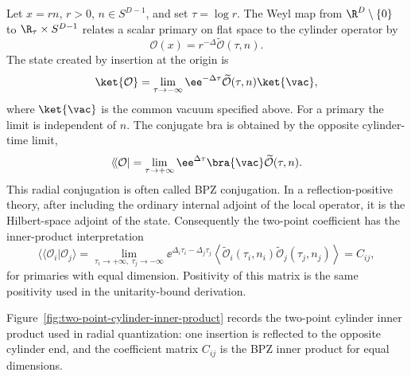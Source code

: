 Let \(x=rn\), \(r>0\), \(n\in S^{D-1}\), and set
\(\tau=\log r\).  The Weyl map from \(\R^D\setminus\{0\}\) to
\(\R_\tau\times S^{D-1}\) relates a scalar primary on flat space to the
cylinder operator by
\begin{equation}
  \mathcal O(x)=r^{-\Delta}\widetilde{\mathcal O}(\tau,n).
  \label{eq:flat-cylinder-scalar-primary}
\end{equation}
The state created by insertion at the origin is
\begin{equation}
  \ket{\mathcal O}
  =
  \lim_{\tau\to-\infty}
  \ee^{-\Delta\tau}
  \widetilde{\mathcal O}(\tau,n)\ket{\vac},
  \label{eq:ket-from-cylinder-limit}
\end{equation}
where \(\ket{\vac}\) is the common vacuum specified above.  For a primary the
limit is independent of \(n\).  The conjugate bra is obtained by the opposite
cylinder-time limit,
\begin{equation}
  \langle\!\langle \mathcal O|
  =
  \lim_{\tau\to+\infty}
  \ee^{\Delta\tau}
  \bra{\vac}\widetilde{\mathcal O}(\tau,n).
  \label{eq:bpz-bra-from-cylinder-limit}
\end{equation}
This radial conjugation is often called BPZ conjugation.  In a
reflection-positive theory, after including the ordinary internal adjoint of the
local operator, it is the Hilbert-space adjoint of the state.  Consequently the
two-point coefficient has the inner-product interpretation
\begin{equation}
  \langle\!\langle \mathcal O_i|\mathcal O_j\rangle
  =
  \lim_{\tau_i\to+\infty,\ \tau_j\to-\infty}
  \ee^{\Delta_i\tau_i-\Delta_j\tau_j}
  \left\langle
    \widetilde{\mathcal O}_i(\tau_i,n_i)
    \widetilde{\mathcal O}_j(\tau_j,n_j)
  \right\rangle
  =
  C_{ij},
  \label{eq:bpz-inner-product-two-point-coefficient}
\end{equation}
for primaries with equal dimension.  Positivity of this matrix is the same
positivity used in the unitarity-bound derivation.

Figure~\ref{fig:two-point-cylinder-inner-product} records the two-point
cylinder inner product used in radial quantization: one insertion is reflected
to the opposite cylinder end, and the coefficient matrix \(C_{ij}\) is the BPZ
inner product for equal dimensions.

